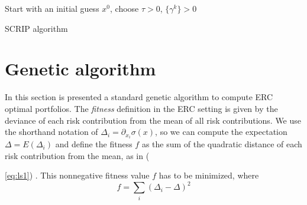 \begin{algorithm}
Start with an initial guess $x^{0}$, choose $\tau > 0$, $\{\gamma^k\}>0$\\
\caption{SCRIP algorithm}
\label{alg:scrip}
\end{algorithm}


\section{Genetic algorithm}
In this section is presented a standard genetic algorithm to compute ERC optimal portfolios. The \textit{fitness} definition in the ERC setting is given by the deviance of each risk contribution from the mean of all risk contributions\footnotemark[3]. We use the shorthand notation of $\Delta_i = \partial_{x_i} \sigma (x)$, so we can compute the expectation $\Delta = E(\Delta_i)$ and define the fitness $f$ as the sum of the quadratic distance of each risk contribution from the mean, as in ({\ref{eq:ls1}) \cite{genetic}. This nonnegative fitness value $f$ has to be minimized, where
\begin{equation}
f= \sum_i (\Delta_i - \Delta)^2
\end{equation}

}
